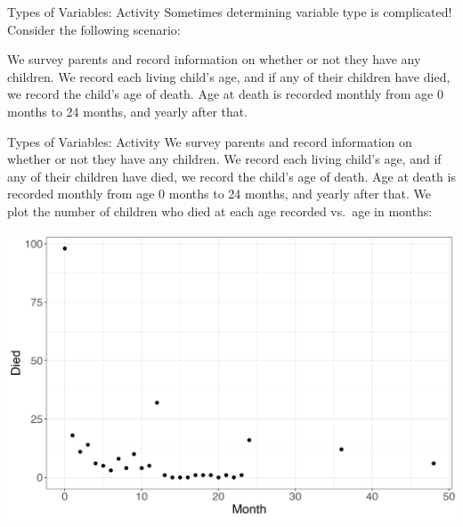 \documentclass[
  ignorenonframetext,
]{beamer}
\begin{document}
\begin{frame}{Types of Variables: Activity}
\protect\hypertarget{types-of-variables-activity}{}
Sometimes determining variable type is complicated! Consider the
following scenario:

We survey parents and record information on whether or not they have any
children. We record each living child's age, and if any of their
children have died, we record the child's age of death. Age at death is
recorded monthly from age 0 months to 24 months, and yearly after that.
\end{frame}

\begin{frame}{Types of Variables: Activity}
\protect\hypertarget{types-of-variables-activity-1}{}
We survey parents and record information on whether or not they have any
children. We record each living child's age, and if any of their
children have died, we record the child's age of death. Age at death is
recorded monthly from age 0 months to 24 months, and yearly after that.
We plot the number of children who died at each age recorded vs.~age in
months:

\includegraphics{u5mr.png}
\end{frame}
\end{document}

